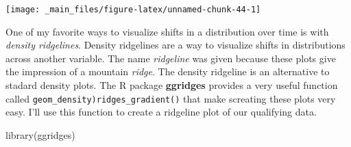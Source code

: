 \documentclass[
]{book}
\newenvironment{Shaded}{\begin{snugshade}}{\end{snugshade}}
\newcommand{\FunctionTok}[1]{\textcolor[rgb]{0.00,0.00,0.00}{#1}}
\newcommand{\NormalTok}[1]{#1}
\begin{document}
\begin{center}\texttt{[image: \_main\_files/figure-latex/unnamed-chunk-44-1]} \end{center}

One of my favorite ways to visualize shifts in a distribution over time is with \emph{density ridgelines}. Density ridgelines are a way to visualize shifts in distributions across another variable. The name \emph{ridgeline} was given because these plots give the impression of a mountain \emph{ridge}. The density ridgeline is an alternative to stadard density plots. The R package \textbf{ggridges} provides a very useful function called \texttt{geom\_density)ridges\_gradient()} that make screating these plots very easy. I'll use this function to create a ridgeline plot of our qualifying data.

\begin{Shaded}
\begin{Highlighting}[]
\FunctionTok{library}\NormalTok{(ggridges)}


\end{Highlighting}
\end{Shaded}
\end{document}

